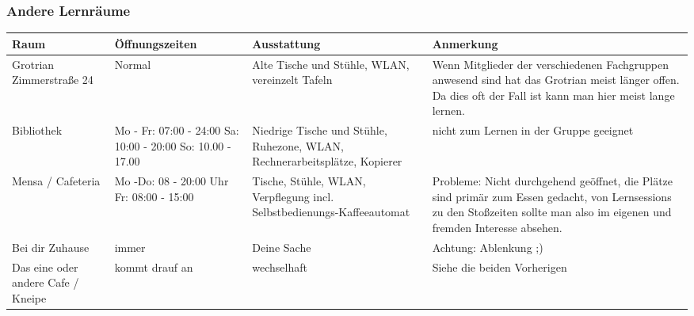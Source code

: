 	\subsubsection*{Andere Lernräume}
		\begin{tabular}{|p{4cm}|p{5cm}|p{3.6cm}|p{4cm}|}
 			\hline Raum & Öffnungszeiten & Ausstattung & Anmerkung  \\  
			\hline Grotrian  Zimmerstraße 24 & Normal  &
			Alte Tische und Stühle, WLAN, vereinzelt Tafeln & Wenn Mitglieder der verschiedenen Fachgruppen anwesend sind hat das Grotrian meist länger offen. Da dies oft der Fall ist kann man hier meist lange lernen. \\ 
			\hline Bibliothek & Mo - Fr: 07:00 - 24:00 Sa:
			10:00 - 20:00 So: 10.00 - 17.00 & Niedrige Tische und Stühle,
			Ruhezone, WLAN, Rechnerarbeits\-plätze, Kopierer &  nicht zum  Lernen in der Gruppe  geeignet \\ 
			\hline Mensa / Cafeteria & Mo -Do: 08 - 20:00 Uhr Fr: 08:00 - 15:00 & Tische, Stühle,  WLAN,  Verpflegung incl. Selbstbedienungs-Kaffeeautomat& Probleme: Nicht durchgehend geöffnet, die Plätze sind primär zum Essen gedacht, von Lernsessions zu den Stoßzeiten sollte man also im eigenen und fremden Interesse absehen. \\ 
			\hline Bei dir Zuhause & immer & Deine Sache & Achtung: Ablenkung ;) \\ 
			\hline Das eine oder andere Cafe / Kneipe & kommt drauf an & wechselhaft &Siehe die beiden Vorherigen \\
			\hline
		\end{tabular}
